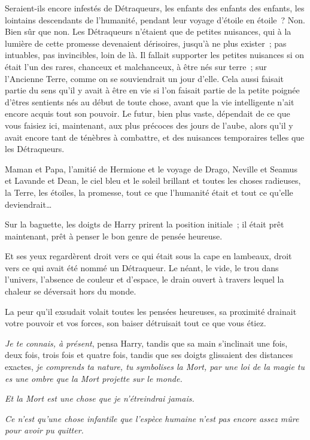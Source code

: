 Seraient-ils encore infestés de Détraqueurs, les enfants des enfants des enfants, les lointains descendants de l'humanité, pendant leur voyage d'étoile en étoile~?
Non. Bien sûr que non.
Les Détraqueurs n'étaient que de petites nuisances, qui à la lumière de cette promesse devenaient dérisoires, jusqu'à ne plus exister~; pas intuables, pas invincibles, loin de là.
Il fallait supporter les petites nuisances si on était l'un des rares, chanceux et malchanceux, à être nés sur terre~; sur l'Ancienne Terre, comme on se souviendrait un jour d'elle.
Cela aussi faisait partie du sens qu'il y avait à être en vie si l'on faisait partie de la petite poignée d'êtres sentients nés au début de toute chose, avant que la vie intelligente n'ait encore acquis tout son pouvoir.
Le futur, bien plus vaste, dépendait de ce que vous faisiez ici, maintenant, aux plus précoces des jours de l'aube, alors qu'il y avait encore tant de ténèbres à combattre, et des nuisances temporaires telles que les Détraqueurs.

Maman et Papa, l'amitié de Hermione et le voyage de Drago, Neville et Seamus et Lavande et Dean, le ciel bleu et le soleil brillant et toutes les choses radieuses, la Terre, les étoiles, la promesse, tout ce que l'humanité était et tout ce qu'elle deviendrait…

Sur la baguette, les doigts de Harry prirent la position initiale~; il était prêt maintenant, prêt à penser le bon genre de pensée heureuse.

Et ses yeux regardèrent droit vers ce qui était sous la cape en lambeaux, droit vers ce qui avait été nommé un Détraqueur.
Le néant, le vide, le trou dans l'univers, l'absence de couleur et d'espace, le drain ouvert à travers lequel la chaleur se déversait hors du monde.

La peur qu'il exsudait volait toutes les pensées heureuses, sa proximité drainait votre pouvoir et vos forces, son baiser détruisait tout ce que vous étiez.

\emph{Je te connais, à présent}, pensa Harry, tandis que sa main s'inclinait une fois, deux fois, trois fois et quatre fois, tandis que ses doigts glissaient des distances exactes, \emph{je comprends ta nature, tu symbolises la Mort, par une loi de la magie tu es une ombre que la Mort projette sur le monde.}

\emph{Et la Mort est une chose que je n'étreindrai jamais.}

\emph{Ce n'est qu'une chose infantile que l'espèce humaine n'est pas encore assez mûre pour avoir pu quitter.}

